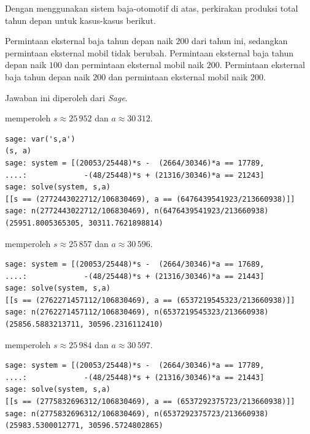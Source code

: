 \begin{exercises}
  \item
    Dengan menggunakan sistem baja-otomotif di atas, perkirakan
    produksi total tahun depan untuk kasus-kasus berikut.
    \begin{exparts}
      \partsitem Permintaan eksternal baja tahun depan naik $200$ dari
         tahun ini, sedangkan permintaan eksternal mobil tidak berubah.
      \partsitem Permintaan eksternal baja tahun depan naik $100$ dan
         permintaan eksternal mobil naik $200$.
      \partsitem Permintaan eksternal baja tahun depan naik $200$ dan
         permintaan eksternal mobil naik $200$.
    \end{exparts}
    \begin{answer}
      Jawaban ini diperoleh dari \textit{Sage}.
      \begin{exparts}
        \partsitem \Sage{} memperoleh $s\approx 25\,952$ dan $a\approx 30\,312$.
\begin{lstlisting}
sage: var('s,a')
(s, a)
sage: system = [(20053/25448)*s -  (2664/30346)*a == 17789,
....:             -(48/25448)*s + (21316/30346)*a == 21243]
sage: solve(system, s,a)
[[s == (2772443022712/106830469), a == (6476439541923/213660938)]]
sage: n(2772443022712/106830469), n(6476439541923/213660938)
(25951.8005365305, 30311.7621898814)          
\end{lstlisting}
        \partsitem \Sage{} memperoleh $s\approx 25\,857$ dan $a\approx 30\,596$.
\begin{lstlisting}
sage: system = [(20053/25448)*s -  (2664/30346)*a == 17689,
....:             -(48/25448)*s + (21316/30346)*a == 21443]
sage: solve(system, s,a)
[[s == (2762271457112/106830469), a == (6537219545323/213660938)]]
sage: n(2762271457112/106830469), n(6537219545323/213660938)
(25856.5883213711, 30596.2316112410)
\end{lstlisting}
        \partsitem \Sage{} memperoleh $s\approx 25\,984$ dan $a\approx 30\,597$.
\begin{lstlisting}
sage: system = [(20053/25448)*s -  (2664/30346)*a == 17789,
....:             -(48/25448)*s + (21316/30346)*a == 21443]
sage: solve(system, s,a)
[[s == (2775832696312/106830469), a == (6537292375723/213660938)]]
sage: n(2775832696312/106830469), n(6537292375723/213660938)
(25983.5300012771, 30596.5724802865)          
\end{lstlisting}
      \end{exparts}
    \end{answer}
  \item

\end{exercises}
